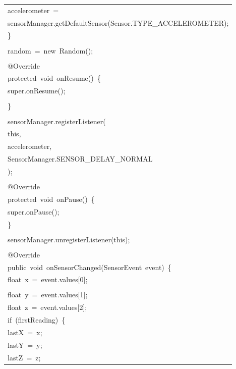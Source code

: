 \documentclass[a4paper,12pt]{article}
\begin{document}
\begin{longtable}{|p{}|}
{\ttfamily\small accelerometer\ =} \\
{\ttfamily\small sensorManager.getDefaultSensor(Sensor.TYPE\_ACCELEROMETER);} \\
{\ttfamily\small \}} \\
\strut \\
{\ttfamily\small random\ =\ new\ Random();} \\
\strut \\
{\ttfamily\small @Override} \\
{\ttfamily\small protected\ void\ onResume()\ \{} \\
{\ttfamily\small super.onResume();} \\
\strut \\
{\ttfamily\small \}} \\
\strut \\
{\ttfamily\small sensorManager.registerListener(} \\
{\ttfamily\small this,} \\
{\ttfamily\small accelerometer,} \\
{\ttfamily\small SensorManager.SENSOR\_DELAY\_NORMAL} \\
{\ttfamily\small );} \\
\strut \\
{\ttfamily\small @Override} \\
{\ttfamily\small protected\ void\ onPause()\ \{} \\
{\ttfamily\small super.onPause();} \\
{\ttfamily\small \}} \\
\strut \\
{\ttfamily\small sensorManager.unregisterListener(this);} \\
\strut \\
{\ttfamily\small @Override} \\
{\ttfamily\small public\ void\ onSensorChanged(SensorEvent\ event)\ \{} \\
{\ttfamily\small float\ x\ =\ event.values[0];} \\
\strut \\
{\ttfamily\small float\ y\ =\ event.values[1];} \\
{\ttfamily\small float\ z\ =\ event.values[2];} \\
{\ttfamily\small if\ (firstReading)\ \{} \\
{\ttfamily\small lastX\ =\ x;} \\
{\ttfamily\small lastY\ =\ y;} \\
{\ttfamily\small lastZ\ =\ z;} \\

\end{longtable}
\end{document}
